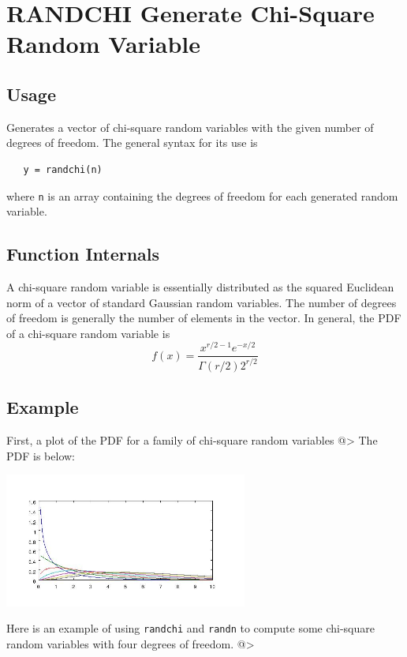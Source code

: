 \section{RANDCHI Generate Chi-Square Random Variable}

\subsection{Usage}

Generates a vector of chi-square random variables with the
given number of degrees of freedom.  The general syntax for
its use is 
\begin{verbatim}
   y = randchi(n)
\end{verbatim}
where \verb|n| is an array containing the degrees of freedom for
each generated random variable.
\subsection{Function Internals}

A chi-square random variable is essentially distributed as
the squared Euclidean norm of a vector of standard Gaussian random 
variables.  The number of degrees of freedom is generally the
number of elements in the vector.  In general, the PDF of
a chi-square random variable is
\[
 f(x) = \frac{x^{r/2-1}e^{-x/2}}{\Gamma(r/2)2^{r/2}}
\]
\subsection{Example}

First, a plot of the PDF for a family of chi-square random variables
@>
The PDF is below:


\centerline{\includegraphics[width=8cm]{chipdf}}

Here is an example of using \verb|randchi| and \verb|randn| to compute
some chi-square random variables with four degrees of freedom.
@>
